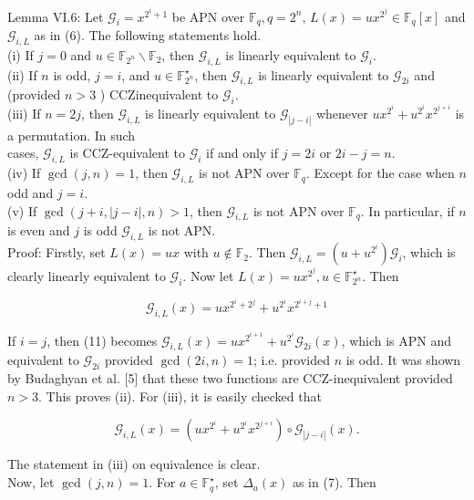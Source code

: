 \documentclass[10pt]{article}
\begin{document}
Lemma VI.6: Let $\mathcal{G}_{i}=x^{2^{i}+1}$ be APN over $\mathbb{F}_{q}, q=2^{n}$, $L(x)=u x^{2^{j}} \in \mathbb{F}_{q}[x]$ and $\mathcal{G}_{i, L}$ as in (6). The following statements hold.\\
(i) If $j=0$ and $u \in \mathbb{F}_{2^{n}} \backslash \mathbb{F}_{2}$, then $\mathcal{G}_{i, L}$ is linearly equivalent to $\mathcal{G}_{i}$.\\
(ii) If $n$ is odd, $j=i$, and $u \in \mathbb{F}_{2^{n}}^{\star}$, then $\mathcal{G}_{i, L}$ is linearly equivalent to $\mathcal{G}_{2 i}$ and (provided $n>3$ ) CCZinequivalent to $\mathcal{G}_{i}$.\\
(iii) If $n=2 j$, then $\mathcal{G}_{i, L}$ is linearly equivalent to $\mathcal{G}_{|j-i|}$ whenever $u x^{2^{i}}+u^{2^{i}} x^{2^{j+i}}$ is a permutation. In such\\
cases, $\mathcal{G}_{i, L}$ is CCZ-equivalent to $\mathcal{G}_{i}$ if and only if $j=2 i$ or $2 i-j=n$.\\
(iv) If $\operatorname{gcd}(j, n)=1$, then $\mathcal{G}_{i, L}$ is not APN over $\mathbb{F}_{q}$. Except for the case when $n$ odd and $j=i$.\\
(v) If $\operatorname{gcd}(j+i,|j-i|, n)>1$, then $\mathcal{G}_{i, L}$ is not APN over $\mathbb{F}_{q}$. In particular, if $n$ is even and $j$ is odd $\mathcal{G}_{i, L}$ is not APN.\\
Proof: Firstly, set $L(x)=u x$ with $u \notin \mathbb{F}_{2}$. Then $\mathcal{G}_{i, L}= \left(u+u^{2^{i}}\right) \mathcal{G}_{i}$, which is clearly linearly equivalent to $\mathcal{G}_{i}$. Now let $L(x)=u x^{2^{j}}, u \in \mathbb{F}_{2^{n}}^{\star}$. Then


\begin{equation*}
\mathcal{G}_{i, L}(x)=u x^{2^{i}+2^{j}}+u^{2^{i}} x^{2^{i+j}+1} \tag{11}
\end{equation*}


If $i=j$, then (11) becomes $\mathcal{G}_{i, L}(x)=u x^{2^{i+1}}+u^{2^{i}} \mathcal{G}_{2 i}(x)$, which is APN and equivalent to $\mathcal{G}_{2 i}$ provided $\operatorname{gcd}(2 i, n)=1$; i.e. provided $n$ is odd. It was shown by Budaghyan et al. [5] that these two functions are CCZ-inequivalent provided $n>3$. This proves (ii). For (iii), it is easily checked that

$$
\mathcal{G}_{i, L}(x)=\left(u x^{2^{i}}+u^{2^{i}} x^{2^{j+i}}\right) \circ \mathcal{G}_{|j-i|}(x) .
$$

The statement in (iii) on equivalence is clear.\\
Now, let $\operatorname{gcd}(j, n)=1$. For $a \in \mathbb{F}_{q}^{\star}$, set $\Delta_{a}(x)$ as in (7). Then
\end{document}
